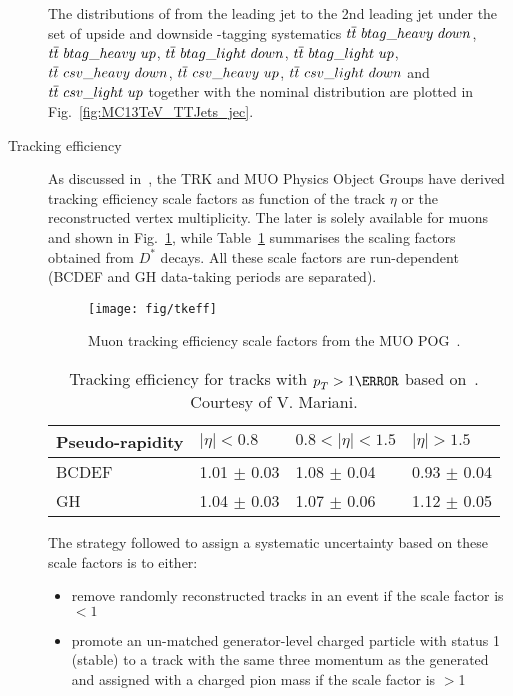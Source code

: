 \begin{description}
The distributions of \pullangle from the leading jet \leadingjet to the 2nd leading jet \scndleadingjet under the set of upside and downside \cPqb-tagging systematics $t\overline{t}\ btag\_heavy\ down$, $t\overline{t}\ btag\_heavy\ up$, $t\overline{t}\ btag\_light\ down$, $t\overline{t}\ btag\_light\ up$, $t\overline{t}\ csv\_heavy\ down$, $t\overline{t}\ csv\_heavy\ up$, $t\overline{t}\ csv\_light\ down$ and $t\overline{t}\ csv\_light\ up$ together with the nominal distribution are plotted in Fig.~\ref{fig:MC13TeV_TTJets_jec}.

\item[Tracking efficiency]
As discussed in~\cite{CMS-AN-2017-175}, the TRK and MUO Physics Object Groups have derived tracking efficiency scale factors as function of the track $\eta$ or the reconstructed vertex multiplicity. The later is solely available for muons and shown in Fig.~\ref{fig:mutksf}, while Table~\ref{tab:dstartsf} summarises the scaling factors obtained from $D^*$ decays. All these scale factors are run-dependent (BCDEF and GH data-taking periods are separated).

\begin{figure}[htp]
  \centering
  \texttt{[image: fig/tkeff]}%
  \caption{Muon tracking efficiency scale factors from the MUO POG~\cite{twiki:MUO}.}
  \label{fig:mutksf}
\end{figure}

\begin{table}[htb]
\begin{center}
\caption{Tracking efficiency for tracks with $\pt>1\GeV$ based on~\cite{CMS-AN-2015-048,twiki:trkpogeff,CMS-DP-2016-012}.
Courtesy of V. Mariani.}
\label{tab:dstartsf}
\begin{tabular}{llll}
\hline
Pseudo-rapidity & $|\eta|<0.8$ & $0.8<|\eta|<1.5$ & $|\eta|>1.5$ \\
\hline
BCDEF & 1.01 $\pm$ 0.03 & 1.08 $\pm$ 0.04 & 0.93 $\pm$ 0.04 \\
GH & 1.04 $\pm$ 0.03 & 1.07 $\pm$ 0.06 & 1.12 $\pm$ 0.05 \\
\hline
\end{tabular}
\end{center}
\end{table}
The strategy followed to assign a systematic uncertainty based on these scale factors is to either:

\begin{itemize}
\item remove randomly reconstructed tracks in an event if the scale factor is $<1$
\item promote an un-matched generator-level charged particle with status 1 (stable) to a track with the same
three momentum as the generated and assigned with a charged pion mass if the scale factor is $>$1
\end{itemize}


\end{description}
